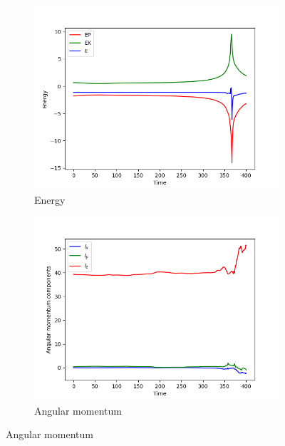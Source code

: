 \begin{figure}[!ht]
    \centering
    \begin{subfigure}[b]{0.45\textwidth}
        \centering
        \includegraphics[width=\textwidth]{chapters/results/img/bh-collision/energy.png}
        \caption{Energy}
        \label{fig:physical-quantities-bh-collision-sub1}
    \end{subfigure}
    \hfill
    \begin{subfigure}[b]{0.45\textwidth}
        \centering
        \includegraphics[width=\textwidth]{chapters/results/img/bh-collision/angular-momentum.png}
        \caption{Angular momentum}
        \label{fig:physical-quantities-bh-collision-sub2}
    \end{subfigure}


\end{figure}
